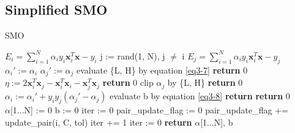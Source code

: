 \documentclass[../main.tex]{subfiles}
\begin{document}
\subsection{Simplified SMO}
\smallskip\begin{algorithm}[H]
\caption{SMO}\label{smo}
\begin{algorithmic}[5]
  \State $E_i=\sum_{i=1}^N\alpha_iy_i\textbf{x}_i^T\textbf{x}-y_i$
    \State j := rand(1, N), j $\neq$ i
    \State $E_j=\sum_{i=1}^N\alpha_iy_i\textbf{x}_i^T\textbf{x}-y_j$
    \State $\alpha_i':=\alpha_i$
    \State $\alpha_j':=\alpha_j$
    \State evaluate \{L, H\} by equation \ref{eq3-7}
      \State \textbf{return} 0
    \EndIf
    \State $\eta:=2\textbf{x}_i^T\textbf{x}_j-\textbf{x}_i^T\textbf{x}_i-\textbf{x}_j^T\textbf{x}_j$
      \State \textbf{return} 0
    \EndIf
    \State clip $\alpha_j$ by \{L, H\}
      \State \textbf{return} 0
    \EndIf
    \State $\alpha_i:=\alpha_i'+y_iy_j(\alpha_j'-\alpha_j)$
    evaluate b by equation \ref{eq3-8}
    \State \textbf{return}
  \EndIf
  \State \textbf{return} 0
\EndProcedure
\\
  \State $\alpha$[1...N] := 0
  \State b := 0
  \State iter := 0
    \State pair\_update\_flag := 0
      \State pair\_update\_flag += update\_pair(i, C, tol)
    \EndFor
      \State iter += 1
    \Else
      \State iter := 0
    \EndIf
  \EndWhile
  \State \textbf{return} $\alpha$[1...N], b
\EndProcedure
\end{algorithmic}
\end{algorithm}\smallskip
\end{document}
